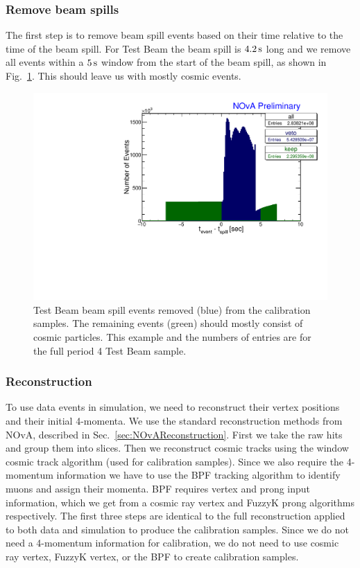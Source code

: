 \subsubsection*{Remove beam spills}
The first step is to remove beam spill events based on their time relative to the time of the beam spill. For Test Beam the beam spill is $\unit[4.2]{s}$ long and we remove all events within a $\unit[5]{s}$ window from the start of the beam spill, as shown in Fig.~\ref{fig:RemoveTBSpills}. This should leave us with mostly cosmic events.

\begin{figure}[hbtp]
\centering
\includegraphics[width=\textwidth]{Plots/TBCalibration/RemoveTBSpills.pdf}
\caption[Removing Test Beam beam spill]{Test Beam beam spill events removed (blue) from the calibration samples. The remaining events (green) should mostly consist of cosmic particles. This example and the numbers of entries are for the full period 4 Test Beam sample.}
\label{fig:RemoveTBSpills}
\end{figure}

\subsubsection*{Reconstruction}
To use data events in simulation, we need to reconstruct their vertex positions and their initial 4-momenta. We use the standard reconstruction methods from \gls{NOvA}, described in Sec.~\ref{sec:NOvAReconstruction}. First we take the raw hits and group them into slices. Then we reconstruct cosmic tracks using the window cosmic track algorithm (used for calibration samples). Since we also require the 4-momentum information we have to use the \gls{BPF} tracking algorithm to identify muons and assign their momenta. \gls{BPF} requires vertex and prong input information, which we get from a cosmic ray vertex and FuzzyK prong algorithms respectively. The first three steps are identical to the full reconstruction applied to both data and simulation to produce the calibration samples. Since we do not need a 4-momentum information for calibration, we do not need to use cosmic ray vertex, FuzzyK vertex, or the \gls{BPF} to create calibration samples.

